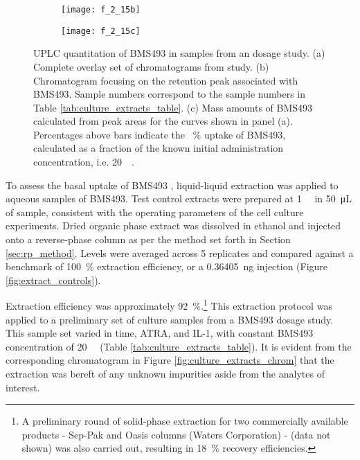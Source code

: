 \begin{refsection}
\begin{figure}[h!]
    \begin{subfigure}[b]{0.45\textwidth}
        \texttt{[image: f\_2\_15b]}
        \caption{}
        \label{fig:culture_extracts_chrom_zoom}
    \end{subfigure}
    \begin{subfigure}[b]{0.5\textwidth}
        \texttt{[image: f\_2\_15c]}
        \caption{}
        \label{fig:culture_extracts_chart}
    \end{subfigure}
    \caption[UPLC quantitation of BMS493 in samples from an 
    dosage study]{UPLC quantitation of BMS493 in samples from an  dosage study. (a) Complete overlay set of chromatograms from study.
    (b) Chromatogram focusing on the retention peak associated with BMS493.
    Sample numbers correspond to the sample numbers in Table
    \ref{tab:culture_extracts_table}. (c) Mass amounts of BMS493 calculated from peak
    areas for the curves shown in panel (a). Percentages above bars indicate the
    \SI{}{\percent} uptake of BMS493, calculated as a fraction of the known
    initial administration concentration, i.e. \SI{20}{\micro\moLar}.     
}\label{fig:uplc_report_culture_extracts}
\end{figure}
To assess the basal uptake of BMS493 , liquid-liquid
extraction was applied to aqueous samples of BMS493. Test control extracts were
prepared at \SI{1}{\micro\moLar} in \SI{50}{\uL} of sample, consistent with the
operating parameters of the  cell culture experiments. Dried
organic phase extract was dissolved in ethanol and injected onto a reverse-phase
column as per the method set forth in Section \ref{sec:rp_method}. Levels were
averaged across 5 replicates and compared against a benchmark of
\SI{100}{\percent} extraction efficiency, or a \SI{0.36405}{\ng} injection
(Figure \ref{fig:extract_controls}).

Extraction efficiency was approximately \SI{92}{\percent}.\footnote{A
    preliminary round of solid-phase extraction for two commercially available
    products - Sep-Pak  and Oasis columns (Waters Corporation) - (data
    not shown) was also carried out, resulting in \SI{18}{\percent} recovery
efficiencies.}
This extraction protocol was applied to a preliminary set of culture samples
from a BMS493 dosage study. This sample set varied in time, ATRA, and IL-1, with
constant BMS493 concentration of \SI{20}{\micro\moLar} (Table
\ref{tab:culture_extracts_table}). It is evident from the corresponding
chromatogram in Figure \ref{fig:culture_extracts_chrom} that the extraction was
bereft of any unknown impurities aside from the analytes of interest. 


\end{refsection}
